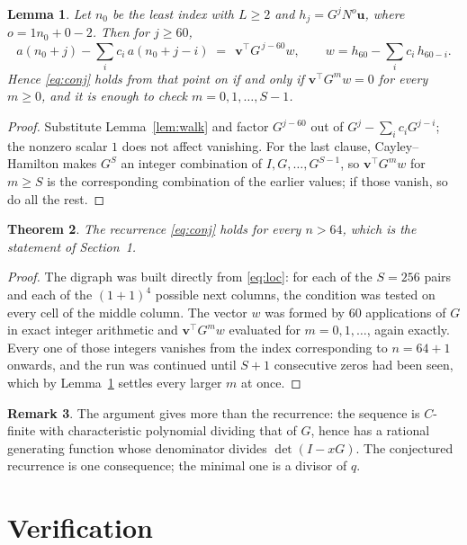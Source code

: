 \documentclass[11pt,a4paper]{article}
\theoremstyle{plain}
\newtheorem{theorem}{Theorem}
\newtheorem{lemma}[theorem]{Lemma}
\theoremstyle{definition}
\newtheorem{remark}[theorem]{Remark}
\begin{document}
\begin{lemma}\label{lem:crit}
Let $n_0$ be the least index with $L\ge2$ and $h_j=G^{j}N^{o}\mathbf{u}$, where
$o=1n_0+0-2$. Then for $j\ge60$,
\[
a(n_0+j)-\sum_i c_i\,a(n_0+j-i)\;=\;\,\mathbf{v}^{\!\top}G^{\,j-60}w,
\qquad w=h_{60}-\sum_i c_i\,h_{60-i} .
\]
Hence \eqref{eq:conj} holds from that point on if and only if
$\mathbf{v}^{\!\top}G^{m}w=0$ for every $m\ge0$, and it is enough to check
$m=0,1,\dots,S-1$.
\end{lemma}

\begin{proof}
Substitute Lemma~\ref{lem:walk} and factor $G^{j-60}$ out of
$G^{j}-\sum_ic_iG^{j-i}$; the nonzero scalar $1$ does not affect
vanishing. For the last clause, Cayley--Hamilton makes $G^{S}$ an integer combination of
$I,G,\dots,G^{S-1}$, so $\mathbf{v}^{\!\top}G^{m}w$ for $m\ge S$ is the corresponding
combination of the earlier values; if those vanish, so do all the rest.
\end{proof}

\begin{theorem}
The recurrence \eqref{eq:conj} holds for every $n>64$, which is the statement of
Section~1.
\end{theorem}

\begin{proof}
The digraph was built directly from \eqref{eq:loc}: for each of the $S=256$ pairs and each
of the $(1+1)^{4}$ possible next columns, the condition was tested on every cell of
the middle column. The vector $w$ was formed by $60$ applications of $G$ in exact integer
arithmetic and $\mathbf{v}^{\!\top}G^{m}w$ evaluated for $m=0,1,\dots$, again exactly.
Every one of those integers vanishes from the index corresponding to $n=64+1$ onwards,
and the run was continued until $S+1$ consecutive zeros had been seen, which by
Lemma~\ref{lem:crit} settles every larger $m$ at once.
\end{proof}

\begin{remark}
The argument gives more than the recurrence: the sequence is $C$-finite with characteristic
polynomial dividing that of $G$, hence has a rational generating function whose denominator
divides $\det(I-xG)$. The conjectured recurrence is one consequence; the minimal one is a
divisor of $q$.
\end{remark}

\section{Verification}
\end{document}
